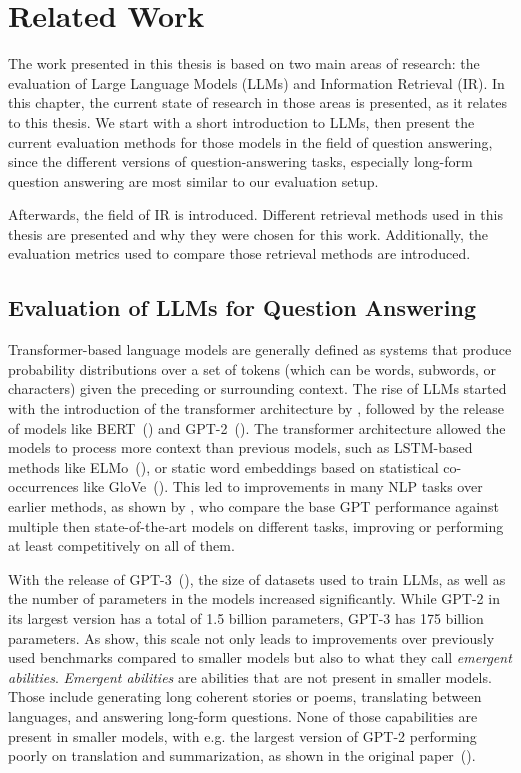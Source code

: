 \chapter{Related Work}\label{related-work}
The work presented in this thesis is based on two main areas of research: the evaluation of Large Language Models (LLMs) and Information Retrieval (IR).
In this chapter, the current state of research in those areas is presented, as it relates to this thesis.
We start with a short introduction to LLMs, then present the current evaluation methods for those models in the field of question answering, since the different versions of question-answering tasks, especially long-form question answering are most similar to our evaluation setup.

Afterwards, the field of IR is introduced.
Different retrieval methods used in this thesis are presented and why they were chosen for this work.
Additionally, the evaluation metrics used to compare those retrieval methods are introduced.

\section{Evaluation of LLMs for Question Answering}\label{sec:evaluation-of-large-language-models}
Transformer-based language models are generally defined as systems that produce probability distributions over a set of tokens (which can be words, subwords, or characters) given the preceding or surrounding context.    
The rise of LLMs started with the introduction of the transformer architecture by \cite{vaswani:2017:Attention}, followed by the release of models like BERT~(\cite{devlin:2018:BERT}) and GPT-2~(\cite{radford:2018:Improving}).
The transformer architecture allowed the models to process more context than previous models, such as LSTM-based methods like ELMo~(\cite{peters:2018:Deep}), or static word embeddings based on statistical co-occurrences like GloVe~(\cite{pennington:2014:Glove}).
This led to improvements in many NLP tasks over earlier methods, as shown by \cite{radford:2018:Improving}, who compare the base GPT performance against multiple then state-of-the-art models on different tasks, improving or performing at least competitively on all of them.

With the release of GPT-3~(\cite{brown:2020:Language}), the size of datasets used to train LLMs, as well as the number of parameters in the models increased significantly.
While GPT-2 in its largest version has a total of 1.5 billion parameters, GPT-3 has 175 billion parameters.
As \cite{wei:2022:Emergent} show, this scale not only leads to improvements over previously used benchmarks compared to smaller models but also to what they call \textit{emergent abilities}.
\textit{Emergent abilities} are abilities that are not present in smaller models.
Those include generating long coherent stories or poems, translating between languages, and answering long-form questions.
None of those capabilities are present in smaller models, with e.g. the largest version of GPT-2 performing poorly on translation and summarization, as shown in the original paper~(\cite{radford:2018:Improving}).

